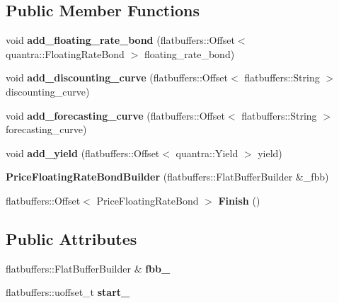 \subsection*{Public Member Functions}
\begin{DoxyCompactItemize}
\item 
\mbox{\label{structquantra_1_1PriceFloatingRateBondBuilder_af32de9710b2c599896224ff885dc173f}} 
void {\bfseries add\+\_\+floating\+\_\+rate\+\_\+bond} (flatbuffers\+::\+Offset$<$ quantra\+::\+Floating\+Rate\+Bond $>$ floating\+\_\+rate\+\_\+bond)
\item 
\mbox{\label{structquantra_1_1PriceFloatingRateBondBuilder_a2caba4dc445bc5d70bcf42b4ad3c2215}} 
void {\bfseries add\+\_\+discounting\+\_\+curve} (flatbuffers\+::\+Offset$<$ flatbuffers\+::\+String $>$ discounting\+\_\+curve)
\item 
\mbox{\label{structquantra_1_1PriceFloatingRateBondBuilder_a2e98332b4570fddb1e8306ba741d0e94}} 
void {\bfseries add\+\_\+forecasting\+\_\+curve} (flatbuffers\+::\+Offset$<$ flatbuffers\+::\+String $>$ forecasting\+\_\+curve)
\item 
\mbox{\label{structquantra_1_1PriceFloatingRateBondBuilder_a7c67ec2b72377ca9a19e1fe79e771665}} 
void {\bfseries add\+\_\+yield} (flatbuffers\+::\+Offset$<$ quantra\+::\+Yield $>$ yield)
\item 
\mbox{\label{structquantra_1_1PriceFloatingRateBondBuilder_ae05111851f97db1c82fd3316ae33fa5a}} 
{\bfseries Price\+Floating\+Rate\+Bond\+Builder} (flatbuffers\+::\+Flat\+Buffer\+Builder \&\+\_\+fbb)
\item 
\mbox{\label{structquantra_1_1PriceFloatingRateBondBuilder_a370d16128dbaf70b93bab0c7984444d2}} 
flatbuffers\+::\+Offset$<$ Price\+Floating\+Rate\+Bond $>$ {\bfseries Finish} ()
\end{DoxyCompactItemize}
\subsection*{Public Attributes}
\begin{DoxyCompactItemize}
\item 
\mbox{\label{structquantra_1_1PriceFloatingRateBondBuilder_a72d8bf93fef096d186336c910637f497}} 
flatbuffers\+::\+Flat\+Buffer\+Builder \& {\bfseries fbb\+\_\+}
\item 
\mbox{\label{structquantra_1_1PriceFloatingRateBondBuilder_ac9f2d15a119f4d9e54b7698204f81175}} 
flatbuffers\+::uoffset\+\_\+t {\bfseries start\+\_\+}
\end{DoxyCompactItemize}


